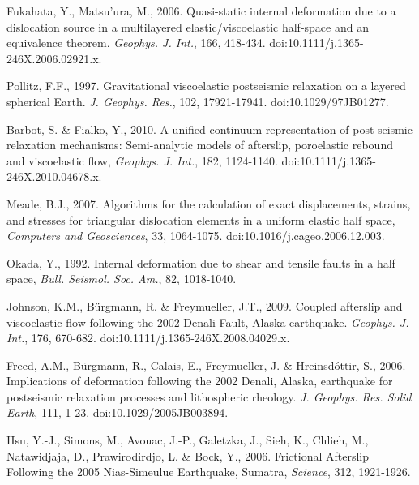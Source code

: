 \documentclass[fleqn,12pt]{article}
\begin{document}
\begin{thebibliography}{}

 Fukahata, Y.,
  Matsu’ura, M., 2006. Quasi-static internal deformation due to a
  dislocation source in a multilayered elastic/viscoelastic half-space
  and an equivalence theorem. \textit{Geophys. J. Int.}, 166,
  418-434. doi:10.1111/j.1365-246X.2006.02921.x.

 Pollitz, F.F.,
  1997. Gravitational viscoelastic postseismic relaxation on a layered
  spherical Earth. \textit{J. Geophys. Res.}, 102,
  17921-17941. doi:10.1029/97JB01277.

 Barbot, S. \&
  Fialko, Y., 2010. A unified continuum representation of post-seismic
  relaxation mechanisms: Semi-analytic models of afterslip,
  poroelastic rebound and viscoelastic flow, \textit{Geophys. J.
    Int.}, 182, 1124-1140. doi:10.1111/j.1365-246X.2010.04678.x.

 Meade, B.J., 2007. Algorithms for the
  calculation of exact displacements, strains, and stresses for
  triangular dislocation elements in a uniform elastic half space,
  \textit{Computers and Geosciences}, 33,
  1064-1075. doi:10.1016/j.cageo.2006.12.003.

 Okada, Y., 1992. Internal
  deformation due to shear and tensile faults in a half space,
  \textit{Bull. Seismol. Soc.  Am.}, 82, 1018-1040.

Johnson, K.M.,
  B\"urgmann, R. \& Freymueller, J.T., 2009. Coupled afterslip and
  viscoelastic flow following the 2002 Denali Fault, Alaska
  earthquake. \textit{Geophys. J.  Int.}, 176,
  670-682. doi:10.1111/j.1365-246X.2008.04029.x.

 Freed, A.M., B\"urgmann,
  R., Calais, E., Freymueller, J. \& Hreinsd\'ottir, S.,
  2006. Implications of deformation following the 2002 Denali, Alaska,
  earthquake for postseismic relaxation processes and lithospheric
  rheology. \textit{J. Geophys. Res. Solid Earth}, 111,
  1-23. doi:10.1029/2005JB003894.

 Hsu, Y.-J., Simons, M., Avouac,
  J.-P., Galetzka, J., Sieh, K., Chlieh, M., Natawidjaja, D.,
  Prawirodirdjo, L. \& Bock, Y., 2006. Frictional Afterslip Following
  the 2005 Nias-Simeulue Earthquake, Sumatra, \textit{Science}, 312,
  1921-1926.


\end{thebibliography}
\end{document}
